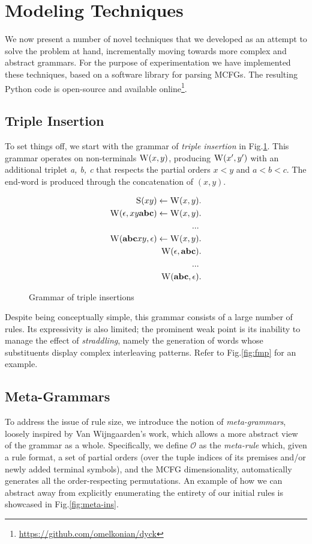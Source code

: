 \documentclass{llncs}
\newcommand\s{\textsc}
\begin{document}
\section{Modeling Techniques}\label{sec2}
We now present a number of novel techniques that we developed as an attempt to solve the problem at hand, incrementally moving towards more complex and abstract grammars. For the purpose of experimentation we have implemented these techniques, based on a software library for parsing MCFGs\cite{ljunglof}. The resulting Python code is open-source and available online\footnote{\url{https://github.com/omelkonian/dyck}}.

\subsection{Triple Insertion}
To set things off, we start with the grammar of \textit{triple insertion} in Fig.\ref{fig:ins}. This grammar operates on non-terminals $\s{W}(x,y)$, producing $\s{W}(x',y')$ with an additional triplet \textit{a, b, c} that respects the partial orders $x<y$ and $a<b<c$. The end-word is produced through the concatenation of $(x,y)$.

\begin{figure}
  \centering
  \begin{align}
	\setcounter{equation}{0}
	\s{S}(xy) \leftarrow \s{W}(x,y)&. \\
	\s{W}(\epsilon, xy\textbf{abc}) \leftarrow \s{W}(x,y)&. \\
	... \nonumber \\
	\setcounter{equation}{60}
	\s{W}(\textbf{abc}xy, \epsilon) \leftarrow \s{W}(x,y)&. \\
	\s{W}(\epsilon, \textbf{abc})&. \\
	... \nonumber \\
	\setcounter{equation}{64}
	\s{W}(\textbf{abc}, \epsilon)&.
	\end{align}
  \caption{Grammar of triple insertions}  
  \label{fig:ins}
\end{figure}

Despite being conceptually simple, this grammar consists of a large number of rules. Its expressivity is also limited; the prominent weak point is its inability to manage the effect of \textit{straddling}, namely the generation of words whose substituents display complex interleaving patterns. Refer to Fig.\ref{fig:fmp} for an example.
\subsection{Meta-Grammars}\label{subsec22}
To address the issue of rule size, we introduce the notion of \textit{meta-grammars}, loosely inspired by Van Wijngaarden's work\cite{vanwijn}, which allows a more abstract view of the grammar as a whole. Specifically, we define $\mathcal{O}$ as the \textit{meta-rule} which, given a rule format, a set of partial orders (over the tuple indices of its premises and/or newly added terminal symbols), and the MCFG dimensionality, automatically generates all the order-respecting permutations. An example of how we can abstract away from explicitly enumerating the entirety of our initial rules is showcased in Fig.\ref{fig:meta-ins}.
\end{document}
